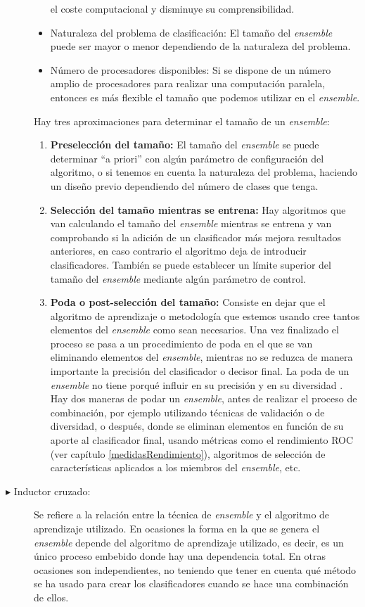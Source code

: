 \begin{description}
\begin{itemize}
el coste computacional y disminuye su comprensibilidad.
\item Naturaleza del problema de clasificación: El tamaño del \textit{ensemble} puede
ser mayor o menor dependiendo de la naturaleza del problema.
\item Número de procesadores disponibles: Si se dispone de un número amplio de
procesadores para realizar una computación paralela, entonces es más flexible el tamaño que podemos
utilizar en el \textit{ensemble}.
\end{itemize}
Hay tres aproximaciones para determinar el tamaño de un \textit{ensemble}:
\begin{enumerate}
\item \textbf{Preselección del tamaño:} El tamaño del \textit{ensemble} se puede
determinar ``a priori'' con algún parámetro de configuración del algoritmo, o si tenemos
en cuenta la naturaleza del problema, haciendo un diseño previo dependiendo del
número de clases que tenga.
	\item \textbf{Selección del tamaño mientras se entrena:} Hay algoritmos que van
calculando el tamaño del \textit{ensemble} mientras se entrena y van comprobando si la
adición de un clasificador más mejora resultados anteriores, en caso contrario el
algoritmo deja de introducir clasificadores. También se puede establecer un límite
superior del tamaño del \textit{ensemble}
mediante algún parámetro de control.
	\item \textbf{Poda o post-selección del tamaño:} Consiste en dejar que el algoritmo de
aprendizaje o metodología que estemos usando cree tantos elementos del \textit{ensemble}
como sean necesarios. Una vez finalizado el proceso se pasa a un procedimiento de poda en
el que se van eliminando elementos del \textit{ensemble}, mientras no se reduzca de manera
importante la precisión del clasificador o decisor final. La poda de un \textit{ensemble}
no tiene porqué influir en su precisión y en su diversidad \cite{Liu2004}. Hay dos maneras
de podar un \textit{ensemble}, antes de realizar el proceso de combinación, por ejemplo
utilizando técnicas de validación o de diversidad, o después, donde se eliminan elementos
en función de su aporte al clasificador final, usando métricas como el rendimiento ROC
(ver capítulo \ref{medidasRendimiento}), algoritmos de selección de características
aplicados a los miembros del \textit{ensemble}, etc.
\end{enumerate}
\item[$\blacktriangleright$ Inductor cruzado:] Se refiere a la relación entre la técnica
de \textit{ensemble} y
el algoritmo de aprendizaje utilizado. En ocasiones la forma en la que se genera el
\textit{ensemble} depende del algoritmo de aprendizaje utilizado, es decir, es un único
proceso embebido donde hay una dependencia total. En otras ocasiones son independientes,
no teniendo que tener en cuenta qué método se ha usado para crear los clasificadores
cuando se hace una combinación de ellos.
\end{description}


